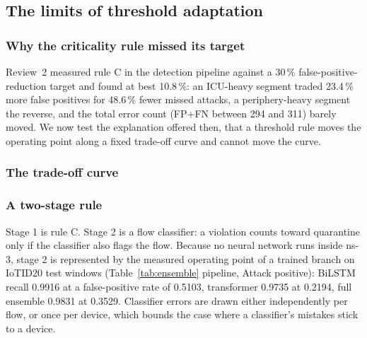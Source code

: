 \subsection{The limits of threshold adaptation}\label{sec:ceiling}
\subsubsection{Why the criticality rule missed its target}
Review~2 measured rule C in the detection pipeline against a 30\,\% false-positive-reduction target and found at best 10.8\,\%: an ICU-heavy segment traded 23.4\,\% more false positives for 48.6\,\% fewer missed attacks, a periphery-heavy segment the reverse, and the total error count (FP+FN between 294 and 311) barely moved. We now test the explanation offered then, that a threshold rule moves the operating point along a fixed trade-off curve and cannot move the curve.

\subsubsection{The trade-off curve}

\subsubsection{A two-stage rule}
Stage 1 is rule C. Stage 2 is a flow classifier: a violation counts toward quarantine only if the classifier also flags the flow. Because no neural network runs inside ns-3, stage 2 is represented by the measured operating point of a trained branch on IoTID20 test windows (Table~\ref{tab:ensemble} pipeline, Attack positive): BiLSTM recall 0.9916 at a false-positive rate of 0.5103, transformer 0.9735 at 0.2194, full ensemble 0.9831 at 0.3529. Classifier errors are drawn either independently per flow, or once per device, which bounds the case where a classifier's mistakes stick to a device.


